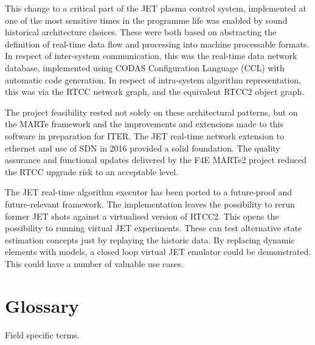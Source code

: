 \documentclass[preprint,12pt]{elsarticle}
\begin{document}
This change to a critical part of the JET plasma control system, implemented
at one of the most sensitive times in the programme life was enabled by 
sound historical architecture choices. These were both based on abstracting
the definition of real-time data flow and processing into machine 
processable formats. In respect of inter-system communication, this was the
real-time data network database, implemented using CODAS Configuration Language
(CCL) with automatic code generation.  In respect of intra-system algorithm
representation, this was via the RTCC network graph, and the equivalent RTCC2
object graph.  

The project feasibility rested not solely on these architectural patterns,
but on the MARTe framework and the improvements
and extensions made to this software in preparation for ITER.  
The JET real-time network extension to ethernet and use of SDN in 2016
provided a solid foundation.  The quality assurance and functional updates delivered
by the F4E MARTe2 project reduced the RTCC upgrade risk to an acceptable level.


The JET real-time algorithm executor has been ported to a future-proof and future-relevant framework.
The implementation leaves the possibility to rerun former JET shots against a virtualised
version of RTCC2. This opens the possibility to running virtual JET experiments.
These can test alternative state estimation concepts just by replaying the historic data.
By replacing dynamic elements with models, a closed loop virtual JET emulator could be demonstrated.
This could have a number of valuable use cases.


\section{Glossary}

Field specific terms.
\end{document}
